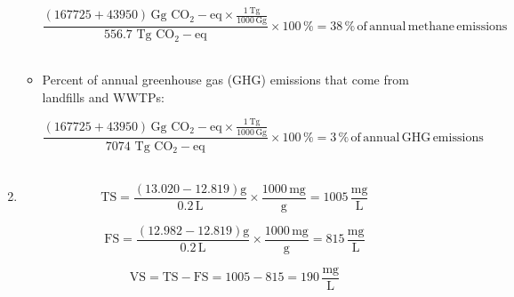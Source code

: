 \documentclass[12pt,letterpaper]{article}
\newcommand{\var}[1]{{\operatorname{#1}}}
\begin{document}
\begin{enumerate}
\begin{itemize}
\begin{equation*}
\mathrm{\frac{(167725 + 43950)\, Gg \,\, \var{CO_2-eq}\times \frac{1\, Tg}{1000\, Gg}}{556.7\, \, Tg\,\, \var{CO_2-eq}}\times 100\, \% = 38 \, \% \,of \,annual \,methane\, emissions}
\end{equation*}\\

\item Percent of annual greenhouse gas (GHG) emissions that come from landfills and WWTPs: 

\begin{equation*}
\mathrm{\frac{(167725 + 43950)\, Gg \,\, \var{CO_2-eq}\times \frac{1\, Tg}{1000\, Gg}}{7074\, \, Tg\,\, \var{CO_2-eq}}\times 100\, \% = 3 \, \% \,of \,annual \,GHG\, emissions}
\end{equation*}\\

\end{itemize}

\item 

\begin{equation*}
\mathrm{TS = \frac{(13.020 - 12.819)g}{0.2\, L}\times \frac{1000\, mg}{g} = 1005\, \frac{mg}{L}}
\end{equation*}

\begin{equation*}
\mathrm{FS = \frac{(12.982 - 12.819)g}{0.2\, L}\times \frac{1000\, mg}{g} = 815\, \frac{mg}{L}}
\end{equation*}

\begin{equation*}
\mathrm{VS = TS - FS = 1005 - 815 = 190\, \frac{mg}{L}}
\end{equation*}
 


\end{enumerate}
\end{document}
